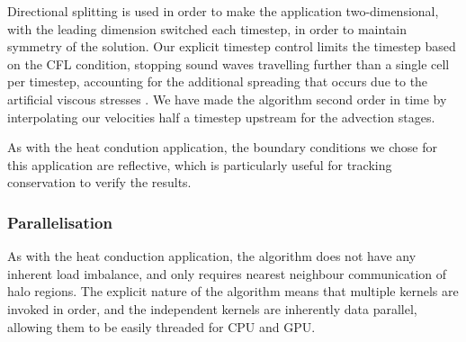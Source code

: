 \documentclass[runningheads,a4paper]{llncs}
\begin{document}
Directional splitting is used in order to make the application two-dimensional, with the leading dimension switched each timestep, in order to maintain symmetry of the solution. Our explicit timestep control limits the timestep based on the CFL condition, stopping sound waves travelling further than a single cell per timestep, accounting for the additional spreading that occurs due to the artificial viscous stresses \cite{Bowers1991}. We have made the algorithm second order in time by interpolating our velocities half a timestep upstream for the advection stages.

As with the heat condution application, the boundary conditions we chose for this application are reflective, which is particularly useful for tracking conservation to verify the results.

\subsubsection{Parallelisation}

As with the heat conduction application, the algorithm does not have any inherent load imbalance, and only requires nearest neighbour communication of halo regions. The explicit nature of the algorithm means that multiple kernels are invoked in order, and the independent kernels are inherently data parallel, allowing them to be easily threaded for CPU and GPU.
\end{document}
